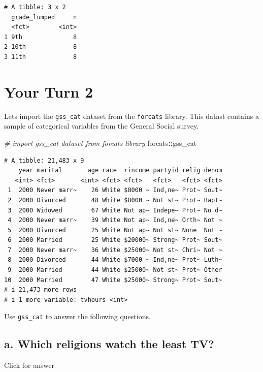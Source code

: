 \documentclass[
]{book}
\newenvironment{Shaded}{\begin{snugshade}}{\end{snugshade}}
\newcommand{\CommentTok}[1]{\textcolor[rgb]{0.56,0.35,0.01}{\textit{#1}}}
\newcommand{\NormalTok}[1]{#1}
\newcommand{\SpecialCharTok}[1]{\textcolor[rgb]{0.81,0.36,0.00}{\textbf{#1}}}
\begin{document}
\begin{verbatim}
# A tibble: 3 x 2
  grade_lumped     n
  <fct>        <int>
1 9th              8
2 10th             8
3 11th             8
\end{verbatim}

\hypertarget{your-turn-2-2}{%
\section{Your Turn 2}\label{your-turn-2-2}}

Lets import the \texttt{gss\_cat} dataset from the \texttt{forcats} library. This datast contains a sample of categorical variables from the General Social survey.

\begin{Shaded}
\begin{Highlighting}[]
\CommentTok{\# import gss\_cat dataset from forcats library}
\NormalTok{forcats}\SpecialCharTok{::}\NormalTok{gss\_cat}
\end{Highlighting}
\end{Shaded}

\begin{verbatim}
# A tibble: 21,483 x 9
    year marital       age race  rincome partyid relig denom
   <int> <fct>       <int> <fct> <fct>   <fct>   <fct> <fct>
 1  2000 Never marr~    26 White $8000 ~ Ind,ne~ Prot~ Sout~
 2  2000 Divorced       48 White $8000 ~ Not st~ Prot~ Bapt~
 3  2000 Widowed        67 White Not ap~ Indepe~ Prot~ No d~
 4  2000 Never marr~    39 White Not ap~ Ind,ne~ Orth~ Not ~
 5  2000 Divorced       25 White Not ap~ Not st~ None  Not ~
 6  2000 Married        25 White $20000~ Strong~ Prot~ Sout~
 7  2000 Never marr~    36 White $25000~ Not st~ Chri~ Not ~
 8  2000 Divorced       44 White $7000 ~ Ind,ne~ Prot~ Luth~
 9  2000 Married        44 White $25000~ Not st~ Prot~ Other
10  2000 Married        47 White $25000~ Strong~ Prot~ Sout~
# i 21,473 more rows
# i 1 more variable: tvhours <int>
\end{verbatim}

Use \texttt{gss\_cat} to answer the following questions.

\hypertarget{a.-which-religions-watch-the-least-tv}{%
\subsection{a. Which religions watch the least TV?}\label{a.-which-religions-watch-the-least-tv}}

Click for answer
\end{document}
